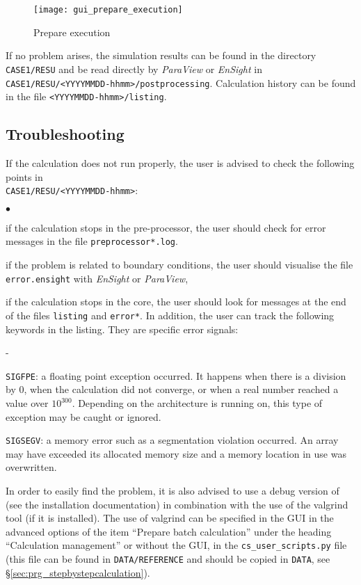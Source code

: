 \begin{figure}[!ht]
\begin{center}
\texttt{[image: gui\_prepare\_execution]}
\caption{Prepare execution}
\label{fig:43_e1}
\end{center}
\end{figure}

If no problem arises, the simulation results can be found in the directory \texttt{CASE1/RESU} and be read directly by {\em ParaView} or {\em EnSight} in \texttt{CASE1/RESU/<YYYYMMDD-hhmm>/postprocessing}. Calculation history can be found in the file \texttt{<YYYYMMDD-hhmm>/listing}.

\subsection{Troubleshooting}
If the calculation does not run properly, the user is advised to check the
following points in\\
\texttt{CASE1/RESU/<YYYYMMDD-hhmm>}:
\begin{list}{$\bullet$}{}
\item  if the calculation stops in the pre-processor, the user should check for error messages in the file \texttt{preprocessor*.log}.
\item if the problem is related to boundary conditions, the user should visualise the file \texttt{error.ensight} with {\em EnSight} or {\em ParaView},
\item if the calculation stops in the \CS core, the user should look for messages at the end of the files \texttt{listing} and \texttt{error*}. In addition, the user can track the following keywords in the listing. They are specific error signals:
  \begin{list}{-}{}
  \item  \texttt{SIGFPE}: a floating point exception occurred. It happens when there is a division by 0, when the calculation did not converge, or when a real number reached a value over $10^{300}$. Depending on the architecture \CS is running
on, this type of exception may be caught or ignored.
  \item  \texttt{SIGSEGV}: a memory error such as a segmentation violation occurred. An array may have exceeded its allocated memory size and a memory location in use was overwritten.
  \end{list}
In order to easily find the problem, it is also advised to use a debug version of \CS (see the installation documentation) in combination with the use of the valgrind tool (if it is installed). The use of valgrind can be specified in the GUI in the advanced options of the item ``Prepare batch calculation'' under the heading ``Calculation management'' or without the GUI, in the \texttt{cs\_user\_scripts.py} file (this file can be found in \texttt{DATA/REFERENCE} and should be copied in \texttt{DATA}, see \S\ref{sec:prg_stepbystepcalculation}).
\end{list}

